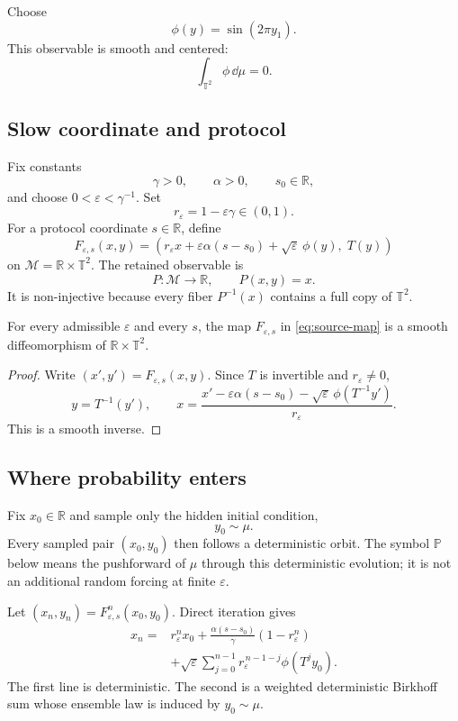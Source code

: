 \documentclass[11pt]{article}
\newcommand{\T}{\mathbb{T}}
\newcommand{\Pp}{\mathbb{P}}
\begin{document}
Choose
\[
\phi(y)=\sin(2\pi y_1).
\]
This observable is smooth and centered:
\[
\int_{\T^2}\phi\,\dd\mu=0.
\]

\subsection{Slow coordinate and protocol}

Fix constants
\[
\gamma>0,\qquad \alpha>0,\qquad s_0\in\mathbb{R},
\]
and choose \(0<\varepsilon<\gamma^{-1}\). Set
\[
r_\varepsilon=1-\varepsilon\gamma\in(0,1).
\]
For a protocol coordinate \(s\in\mathbb{R}\), define
\begin{equation}
F_{\varepsilon,s}(x,y)
=
\left(
r_\varepsilon x+\varepsilon\alpha(s-s_0)
+\sqrt{\varepsilon}\,\phi(y),
\;T(y)
\right)
\label{eq:source-map}
\end{equation}
on
\(
\mathcal{M}=\mathbb{R}\times\T^2
\).
The retained observable is
\[
P:\mathcal{M}\longrightarrow\mathbb{R},
\qquad
P(x,y)=x.
\]
It is non-injective because every fiber \(P^{-1}(x)\) contains a full copy of \(\T^2\).

\begin{proposition}
\label{prop:diffeomorphism}
For every admissible \(\varepsilon\) and every \(s\), the map
\(F_{\varepsilon,s}\) in \eqref{eq:source-map} is a smooth diffeomorphism of
\(\mathbb{R}\times\T^2\).
\end{proposition}

\begin{proof}
Write \((x',y')=F_{\varepsilon,s}(x,y)\). Since \(T\) is invertible and
\(r_\varepsilon\ne0\),
\[
y=T^{-1}(y'),\qquad
x=
\frac{x'-\varepsilon\alpha(s-s_0)
-\sqrt{\varepsilon}\,\phi(T^{-1}y')}
{r_\varepsilon}.
\]
This is a smooth inverse.
\end{proof}

\subsection{Where probability enters}

Fix \(x_0\in\mathbb{R}\) and sample only the hidden initial condition,
\[
y_0\sim\mu.
\]
Every sampled pair \((x_0,y_0)\) then follows a deterministic orbit. The symbol
\(\Pp\) below means the pushforward of \(\mu\) through this deterministic evolution; it is not an additional random forcing at finite \(\varepsilon\).

Let \((x_n,y_n)=F_{\varepsilon,s}^n(x_0,y_0)\). Direct iteration gives
\begin{align}
x_n
={}&r_\varepsilon^n x_0
+\frac{\alpha(s-s_0)}{\gamma}\left(1-r_\varepsilon^n\right)
\nonumber\\
&+\sqrt{\varepsilon}
\sum_{j=0}^{n-1}r_\varepsilon^{\,n-1-j}\phi(T^j y_0).
\label{eq:finite-solution}
\end{align}
The first line is deterministic. The second is a weighted deterministic Birkhoff sum whose ensemble law is induced by \(y_0\sim\mu\).
\end{document}

